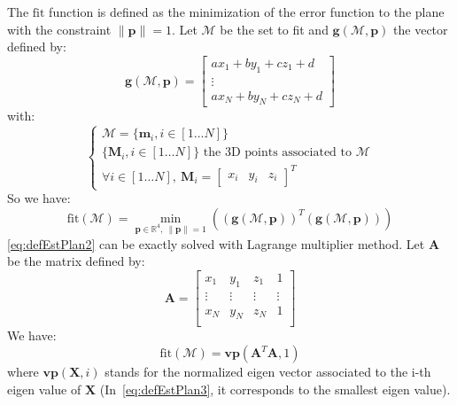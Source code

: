 \documentclass[letterpaper, 10 pt, conference]{ieeeconf}
\begin{document}
The $\mathrm{fit}$ function is defined as the minimization of the error function to the plane with the constraint $\|\mathbf{p}\|=1$. Let $\mathcal{M}$ be the set to fit and $\mathbf{g}(\mathcal{M},\mathbf{p})$ the vector defined by:
\begin{equation}
\mathbf{g}(\mathcal{M},\mathbf{p})=
	\begin{bmatrix}
		ax_1 + by_1 + cz_1 +d \\
		\vdots\\
		ax_N + by_N + cz_N + d
	\end{bmatrix}
	\label{eq:defEstPlan1}
\end{equation}
with:
\begin{equation}
	\left\{
		\begin{array}{l}
			\mathcal{M} = \{\mathbf{m}_i,i\in[1\dots N]\}\\
			\{\mathbf{M}_i,i\in[1\dots N]\}\mbox{ the 3D points associated to }\mathcal{M}\\
			\forall i\in[1\dots N],\ \mathbf{M}_i = \begin{bmatrix} x_i & y_i & z_i \end{bmatrix}^T
		\end{array}
	\right.
\end{equation}
So we have:
\begin{equation}
	\mathrm{fit}(\mathcal{M}) = \min_{\mathbf{p}\in\mathbb{R}^4,\ \|\mathbf{p}\|=1}\left(\left(\mathbf{g}(\mathcal{M},\mathbf{p})\right)^T\left(\mathbf{g}(\mathcal{M},\mathbf{p})\right)\right)
	\label{eq:defEstPlan2}
\end{equation}
\eqref{eq:defEstPlan2} can be exactly solved with Lagrange multiplier method. Let $\mathbf{A}$ be the matrix defined by:
\begin{equation}
	\mathbf{A}=
	\begin{bmatrix}
		x_1 & y_1 & z_1 & 1 \\
		\vdots & \vdots & \vdots & \vdots \\
		x_N & y_N & z_N & 1 \\
	\end{bmatrix}
\end{equation}
We have:
\begin{equation}
	\mathrm{fit}(\mathcal{M}) = \mathbf{vp}(\mathbf{A}^T\mathbf{A},1)
	\label{eq:defEstPlan3}
\end{equation}
where  $\mathbf{vp}(\mathbf{X},i)$ stands for the normalized eigen vector associated to the i-th  eigen value of $\mathbf{X}$ (In~\eqref{eq:defEstPlan3}, it corresponds to the smallest eigen value).
\end{document}
